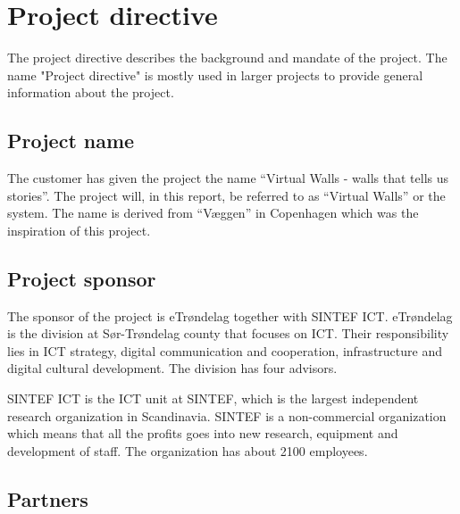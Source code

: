 \documentclass[11pt]{book}
\begin{document}
\section{Project directive}
The project directive describes the background and mandate of the project. The name "Project directive" is mostly used in larger projects to provide general information about the project.

\subsection{Project name}
The customer has given the project the name ``Virtual Walls - walls that tells us stories''. The project will, in this report, be referred to as ``Virtual Walls'' or the system. The name is derived from ``Væggen'' in Copenhagen which was the inspiration of this project.

\subsection{Project sponsor}
The sponsor of the project is eTrøndelag together with SINTEF ICT.
eTrøndelag is the division at Sør-Trøndelag county that focuses on ICT. Their responsibility lies in ICT strategy, digital communication and cooperation, infrastructure and digital cultural development. The division has four advisors.

SINTEF ICT is the ICT unit at SINTEF, which is the largest independent research organization in Scandinavia. SINTEF is a non-commercial organization which means that all the profits goes into new research, equipment and development of staff. The organization has about 2100 employees.

\subsection{Partners}
\end{document}
